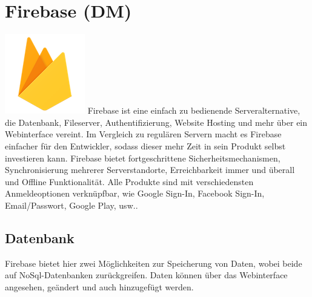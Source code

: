 \section{Firebase (DM)}
\includegraphics{images/firebaseLogo.png}
\newline
Firebase ist eine einfach zu bedienende Serveralternative, die Datenbank, Fileserver, Authentifizierung, Website Hosting und mehr über ein Webinterface vereint. Im Vergleich zu regulären Servern macht es Firebase einfacher für den Entwickler, sodass dieser mehr Zeit in sein Produkt selbst investieren kann. 
Firebase bietet fortgeschrittene Sicherheitsmechanismen, Synchronisierung mehrerer Serverstandorte, Erreichbarkeit immer und überall und Offline Funktionalität.
Alle Produkte sind mit verschiedensten Anmeldeoptionen verknüpfbar, wie Google Sign-In,
Facebook Sign-In, Email/Passwort, Google Play, usw..
\subsection{Datenbank}
Firebase bietet hier zwei Möglichkeiten zur Speicherung von Daten, wobei beide auf NoSql-Datenbanken zurückgreifen. Daten können über das Webinterface angesehen, geändert und auch hinzugefügt werden.
